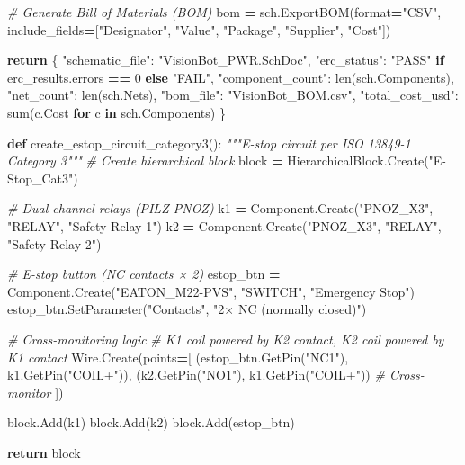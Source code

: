 \documentclass[
]{article}
\newenvironment{Shaded}{\begin{snugshade}}{\end{snugshade}}
\newcommand{\BuiltInTok}[1]{#1}
\newcommand{\CommentTok}[1]{\textcolor[rgb]{0.56,0.35,0.01}{\textit{#1}}}
\newcommand{\ControlFlowTok}[1]{\textcolor[rgb]{0.13,0.29,0.53}{\textbf{#1}}}
\newcommand{\DecValTok}[1]{\textcolor[rgb]{0.00,0.00,0.81}{#1}}
\newcommand{\KeywordTok}[1]{\textcolor[rgb]{0.13,0.29,0.53}{\textbf{#1}}}
\newcommand{\NormalTok}[1]{#1}
\newcommand{\OperatorTok}[1]{\textcolor[rgb]{0.81,0.36,0.00}{\textbf{#1}}}
\newcommand{\StringTok}[1]{\textcolor[rgb]{0.31,0.60,0.02}{#1}}
\begin{document}
\begin{Shaded}
\begin{Highlighting}[]
    \CommentTok{\# Generate Bill of Materials (BOM)}
\NormalTok{    bom }\OperatorTok{=}\NormalTok{ sch.ExportBOM(}\BuiltInTok{format}\OperatorTok{=}\StringTok{"CSV"}\NormalTok{, include\_fields}\OperatorTok{=}\NormalTok{[}\StringTok{"Designator"}\NormalTok{, }\StringTok{"Value"}\NormalTok{, }\StringTok{"Package"}\NormalTok{, }\StringTok{"Supplier"}\NormalTok{, }\StringTok{"Cost"}\NormalTok{])}

    \ControlFlowTok{return}\NormalTok{ \{}
        \StringTok{"schematic\_file"}\NormalTok{: }\StringTok{"VisionBot\_PWR.SchDoc"}\NormalTok{,}
        \StringTok{"erc\_status"}\NormalTok{: }\StringTok{"PASS"} \ControlFlowTok{if}\NormalTok{ erc\_results.errors }\OperatorTok{==} \DecValTok{0} \ControlFlowTok{else} \StringTok{"FAIL"}\NormalTok{,}
        \StringTok{"component\_count"}\NormalTok{: }\BuiltInTok{len}\NormalTok{(sch.Components),}
        \StringTok{"net\_count"}\NormalTok{: }\BuiltInTok{len}\NormalTok{(sch.Nets),}
        \StringTok{"bom\_file"}\NormalTok{: }\StringTok{"VisionBot\_BOM.csv"}\NormalTok{,}
        \StringTok{"total\_cost\_usd"}\NormalTok{: }\BuiltInTok{sum}\NormalTok{(c.Cost }\ControlFlowTok{for}\NormalTok{ c }\KeywordTok{in}\NormalTok{ sch.Components)}
\NormalTok{    \}}

\KeywordTok{def}\NormalTok{ create\_estop\_circuit\_category3():}
    \CommentTok{"""E{-}stop circuit per ISO 13849{-}1 Category 3"""}
    \CommentTok{\# Create hierarchical block}
\NormalTok{    block }\OperatorTok{=}\NormalTok{ HierarchicalBlock.Create(}\StringTok{"E{-}Stop\_Cat3"}\NormalTok{)}

    \CommentTok{\# Dual{-}channel relays (PILZ PNOZ)}
\NormalTok{    k1 }\OperatorTok{=}\NormalTok{ Component.Create(}\StringTok{"PNOZ\_X3"}\NormalTok{, }\StringTok{"RELAY"}\NormalTok{, }\StringTok{"Safety Relay 1"}\NormalTok{)}
\NormalTok{    k2 }\OperatorTok{=}\NormalTok{ Component.Create(}\StringTok{"PNOZ\_X3"}\NormalTok{, }\StringTok{"RELAY"}\NormalTok{, }\StringTok{"Safety Relay 2"}\NormalTok{)}

    \CommentTok{\# E{-}stop button (NC contacts × 2)}
\NormalTok{    estop\_btn }\OperatorTok{=}\NormalTok{ Component.Create(}\StringTok{"EATON\_M22{-}PVS"}\NormalTok{, }\StringTok{"SWITCH"}\NormalTok{, }\StringTok{"Emergency Stop"}\NormalTok{)}
\NormalTok{    estop\_btn.SetParameter(}\StringTok{"Contacts"}\NormalTok{, }\StringTok{"2× NC (normally closed)"}\NormalTok{)}

    \CommentTok{\# Cross{-}monitoring logic}
    \CommentTok{\# K1 coil powered by K2 contact, K2 coil powered by K1 contact}
\NormalTok{    Wire.Create(points}\OperatorTok{=}\NormalTok{[}
\NormalTok{        (estop\_btn.GetPin(}\StringTok{"NC1"}\NormalTok{), k1.GetPin(}\StringTok{"COIL+"}\NormalTok{)),}
\NormalTok{        (k2.GetPin(}\StringTok{"NO1"}\NormalTok{), k1.GetPin(}\StringTok{"COIL+"}\NormalTok{))  }\CommentTok{\# Cross{-}monitor}
\NormalTok{    ])}

\NormalTok{    block.Add(k1)}
\NormalTok{    block.Add(k2)}
\NormalTok{    block.Add(estop\_btn)}

    \ControlFlowTok{return}\NormalTok{ block}
\end{Highlighting}
\end{Shaded}
\end{document}
